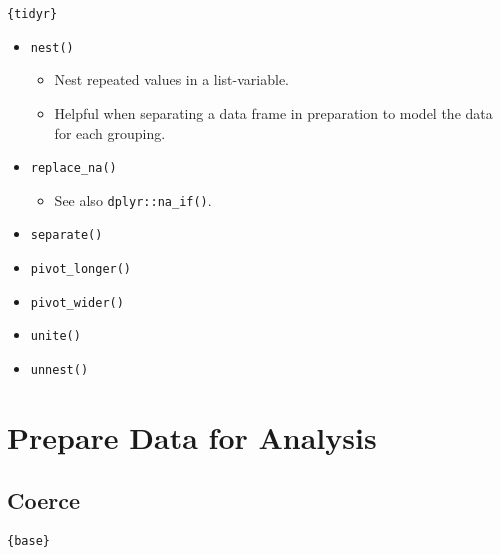 \documentclass[
]{book}
\providecommand{\tightlist}{%
  \setlength{\itemsep}{0pt}\setlength{\parskip}{0pt}}
\begin{document}
\texttt{\{tidyr\}}

\begin{itemize}
\tightlist
\item
  \texttt{nest()}

  \begin{itemize}
  \tightlist
  \item
    Nest repeated values in a list-variable.
  \item
    Helpful when separating a data frame in preparation to model the data for each grouping.
  \end{itemize}
\item
  \texttt{replace\_na()}

  \begin{itemize}
  \tightlist
  \item
    See also \texttt{dplyr::na\_if()}.
  \end{itemize}
\item
  \texttt{separate()}
\item
  \texttt{pivot\_longer()}
\item
  \texttt{pivot\_wider()}
\item
  \texttt{unite()}
\item
  \texttt{unnest()}
\end{itemize}

\hypertarget{prepare-data-for-analysis}{%
\section{Prepare Data for Analysis}\label{prepare-data-for-analysis}}

\hypertarget{coerce}{%
\subsection{Coerce}\label{coerce}}

\texttt{\{base\}}
\end{document}
